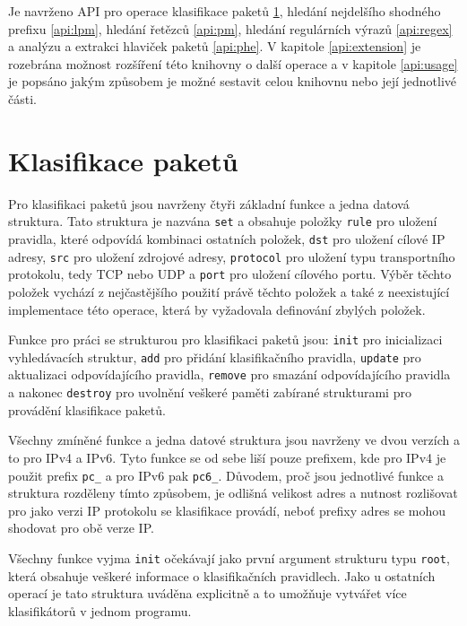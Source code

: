 Je navrženo API pro operace klasifikace paketů \ref{api:pc}, hledání nejdelšího shodného prefixu
\ref{api:lpm}, hledání řetězců \ref{api:pm}, hledání regulárních výrazů \ref{api:regex} a analýzu a
extrakci hlaviček paketů \ref{api:phe}. V kapitole \ref{api:extension} je rozebrána možnost rozšíření této knihovny o další operace a v kapitole \ref{api:usage} je popsáno jakým způsobem je možné sestavit celou knihovnu nebo její jednotlivé
části.
\section{Klasifikace paketů}\label{api:pc} %

Pro klasifikaci paketů jsou navrženy čtyři základní funkce a jedna datová struktura.
Tato struktura je nazvána \texttt{set} a obsahuje položky \texttt{rule} pro uložení pravidla,
které odpovídá kombinaci ostatních položek, \texttt{dst} pro uložení cílové IP adresy,
\texttt{src} pro uložení zdrojové adresy, \texttt{protocol} pro uložení typu transportního protokolu,
tedy TCP nebo UDP a \texttt{port} pro uložení cílového portu.
Výběr těchto položek vychází z nejčastějšího použití právě těchto položek a také z
neexistující implementace této operace, která by vyžadovala definování zbylých položek.

Funkce pro práci se strukturou pro klasifikaci paketů jsou: \texttt{init} pro inicializaci
vyhledávacích struktur, \texttt{add} pro přidání klasifikačního pravidla, \texttt{update}
pro aktualizaci odpovídajícího pravidla, \texttt{remove} pro smazání odpovídajícího pravidla
a nakonec \texttt{destroy} pro uvolnění veškeré paměti zabírané strukturami pro provádění klasifikace
paketů.

Všechny zmíněné funkce a jedna datové struktura jsou navrženy ve dvou verzích a to pro IPv4 a IPv6.
Tyto funkce se od sebe liší pouze prefixem, kde pro IPv4 je použit prefix \texttt{pc\_} a pro
IPv6 pak \texttt{pc6\_}. Důvodem, proč jsou jednotlivé funkce a struktura rozděleny tímto
způsobem, je odlišná velikost adres a nutnost rozlišovat pro jako verzi IP protokolu se klasifikace provádí,
neboť prefixy adres se mohou shodovat pro obě verze IP.

Všechny funkce vyjma \texttt{init} očekávají jako první argument strukturu typu \texttt{root},
která obsahuje veškeré informace o klasifikačních pravidlech. Jako u ostatních operací
je tato struktura uváděna explicitně a to umožňuje vytvářet více klasifikátorů v jednom programu.

